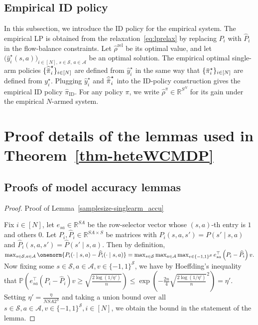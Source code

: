 \documentclass[mnsc,nonblindrev]{informs3}
\renewcommand{\P}{\mathbb{P}}
\newcommand{\Phat}{\widehat{P}}
\newcommand{\rhohat}{\widehat{\rho}}
\newcommand{\pihid}{\widehat{\pi}_{\mathrm{ID}}}
\newcommand{\pibst}{\Bar{\pi}^\star}
\newcommand{\pihbst}{\widehat{\Bar{\pi}}^\star}
\newcommand{\yhst}{\widehat{y}^\star}
\newcommand{\States}{\mathcal{S}}
\newcommand{\Actions}{\mathcal{A}}
\begin{document}
\begin{APPENDICES}
\subsection{Empirical ID policy}
\label{subsec:empirical-id-policy}
In this subsection, we introduce the ID policy for the empirical system. The empirical LP is obtained from the relaxation~\eqref{eq:lprelax} by
replacing \(P_i\) with \(\Phat_i\) in the flow-balance constraints. Let
\(\rhohat^{\mathrm{rel}}\) be its optimal value, and let
\(\bigl(\yhst_i(s,a)\bigr)_{i\in[N],\,s\in\States,\,a\in\Actions}
\)
be an optimal solution. The empirical optimal single-arm policies
\(\{\pihbst_i\}_{i\in[N]}\) are defined from \(\yhst_i\) in the same way
that \(\{\pibst_i\}_{i\in[N]}\) are defined from \(y_i^\star\). Plugging
\(\yhst_i\) and \(\pihbst_i\) into the ID-policy construction gives the
empirical ID policy \(\pihid\). For any policy \(\pi\), we write
\(\rhohat^\pi\in\mathbb R^{S^N}\) for its gain under the empirical
\(N\)-armed system.



\section{Proof details of the lemmas used in Theorem~\ref{thm-heteWCMDP}}
\label{app:full-proof-thm-heteWCMDP}






\subsection{Proofs of model accuracy lemmas}\label{subsec:model-accuracy}




\begin{proof}{Proof of Lemma~\ref{samplesize-singlearm_accu}}

Fix $i\in[N]$, let $e_{sa}\in\mathbb R^{SA}$ be the row-selector 
vector whose $(s,a)$-th entry is $1$ and others $0$. Let $P_i,\widehat P_i\in\mathbb{R}^{SA\times S}$ be matrices with $P_i(s,a,s')=P(s'\mid s,a)$ and $ \widehat P_i(s,a,s')=\widehat P(s'\mid s,a)$. 
Then by definition,
    $
        \max_{s \in \mathcal{S}, a \in \mathcal{A}} \onenorm{P_i(\cdot\mid s,a) - \widehat{P}_i(\cdot\mid s,a)}  
        = \max_{s \in \mathcal{S}} \max_{a \in \mathcal{A}} \max_{v \in \{-1,1\}^{\mathcal{S}}}e_{sa}^\top \left( P_i - \widehat{P}_i\right)v .
    $
    Now fixing some $s \in \mathcal{S}, a \in \mathcal{A}, v \in \{-1,1\}^{\mathcal{S}}$, we have by Hoeffding's inequality that
    $
        \P \left(e_{sa}^\top \left( P_i - \widehat{P}_i\right)v \geq \sqrt{\frac{2\log (1/\eta')}{n}} \right) 
        \leq 
        \exp \left(-\frac{2n}{4} \sqrt{\frac{2\log (1/\eta')}{n}}^2 \right) = \eta'.
    $
    Setting $\eta' = \frac{\eta}{NSA 2^S}$ and taking a union bound over all $s \in \mathcal{S}, a \in \mathcal{A}, v \in \{-1,1\}^{\mathcal{S}}, i\in[N]$, we obtain the bound in the statement of the lemma. 
\end{proof}



\end{APPENDICES}
\end{document}
